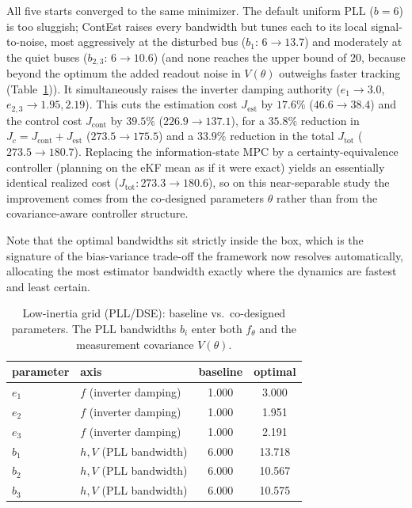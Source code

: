 \documentclass[twocolumn,amsthm]{autart}
\begin{document}
All five starts converged to the same minimizer. The
default uniform PLL ($b=6$) is too sluggish; ContEst raises every bandwidth but
tunes each to its local signal-to-noise, most aggressively at the disturbed bus
($b_1\!:\,6\to13.7$) and moderately at the quiet buses
($b_{2,3}\!:\,6\to10.6$) (and none reaches the upper bound of $20$,
because beyond the optimum the added readout noise in $V(\theta)$ outweighs faster
tracking (Table~\ref{tab:pll})). It simultaneously raises the
inverter damping authority ($e_1\to3.0$, $e_{2,3}\to1.95,2.19$). This cuts the
estimation cost $J_{\mathrm{est}}$ by $17.6\%$ ($46.6\to38.4$) and the control cost
$J_{\mathrm{cont}}$ by $39.5\%$ ($226.9\to137.1$), for a $35.8\%$ reduction in
$J_c=J_{\mathrm{cont}}+J_{\mathrm{est}}$ ($273.5\to175.5$) and a $33.9\%$ reduction in
the total $J_{\mathrm{tot}}$ ($273.5\to180.7$). Replacing the information-state MPC by
a certainty-equivalence controller (planning on the eKF mean as if it were exact)
yields an essentially identical realized cost ($J_{\mathrm{tot}}:273.3\to180.6$),
so on this near-separable study the improvement comes from the co-designed
parameters $\theta$ rather than from the covariance-aware controller structure.

Note that the optimal bandwidths sit strictly inside the box, which is
the signature of the bias-variance trade-off the framework now resolves
automatically, allocating the most estimator bandwidth exactly where the dynamics
are fastest and least certain.


\begin{table}[t]
\centering
\caption{Low-inertia grid (PLL/DSE): baseline vs.\ co-designed parameters. The
PLL bandwidths $b_i$ enter both $f_\theta$ and the measurement covariance
$V(\theta)$.}
\label{tab:pll}
\begin{tabular}{llcc}
\hline
parameter & axis & baseline & optimal \\
\hline
$e_1$ & $f$ (inverter damping) & 1.000 & 3.000 \\
$e_2$ & $f$ (inverter damping) & 1.000 & 1.951 \\
$e_3$ & $f$ (inverter damping) & 1.000 & 2.191 \\
$b_1$ & $h,V$ (PLL bandwidth)  & 6.000 & 13.718 \\
$b_2$ & $h,V$ (PLL bandwidth)  & 6.000 & 10.567 \\
$b_3$ & $h,V$ (PLL bandwidth)  & 6.000 & 10.575 \\
\hline
\end{tabular}
\end{table}
\end{document}
